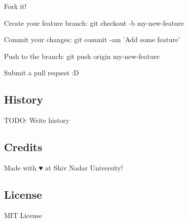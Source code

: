 \begin{DoxyEnumerate}
\item Fork it!
\item Create your feature branch\-: {\ttfamily git checkout -\/b my-\/new-\/feature}
\item Commit your changes\-: {\ttfamily git commit -\/am 'Add some feature'}
\item Push to the branch\-: {\ttfamily git push origin my-\/new-\/feature}
\item Submit a pull request \-:D
\end{DoxyEnumerate}

\subsection*{History}

T\-O\-D\-O\-: Write history

\subsection*{Credits}

Made with ♥ at Shiv Nadar University!

\subsection*{License}

M\-I\-T License 